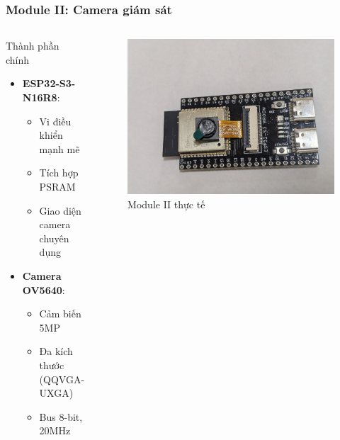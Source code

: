 \begin{frame}
\frametitle{Module II: Camera giám sát}

\begin{columns}
\begin{block}{Thành phần chính}
\begin{itemize}
\item \textbf{ESP32-S3-N16R8}:
  \begin{itemize}
  \item Vi điều khiển mạnh mẽ
  \item Tích hợp PSRAM
  \item Giao diện camera chuyên dụng
  \end{itemize}
\item \textbf{Camera OV5640}:
  \begin{itemize}
  \item Cảm biến 5MP
  \item Đa kích thước (QQVGA-UXGA)
  \item Bus 8-bit, 20MHz
  \end{itemize}
\end{itemize}
\end{block}

\begin{figure}[h]
\centering
\includegraphics[width=\textwidth]{images/real_board2.jpg}
\caption{Module II thực tế}
\end{figure}
\end{columns}

\end{frame}

